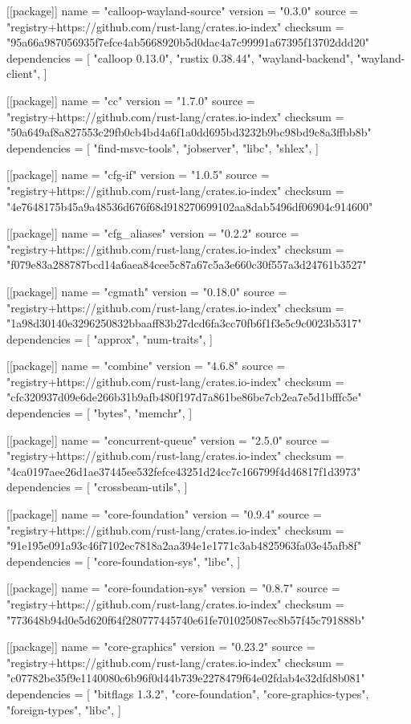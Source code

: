 [[package]]
name = "calloop-wayland-source"
version = "0.3.0"
source = "registry+https://github.com/rust-lang/crates.io-index"
checksum = "95a66a987056935f7efce4ab5668920b5d0dac4a7c99991a67395f13702ddd20"
dependencies = [
 "calloop 0.13.0",
 "rustix 0.38.44",
 "wayland-backend",
 "wayland-client",
]

[[package]]
name = "cc"
version = "1.7.0"
source = "registry+https://github.com/rust-lang/crates.io-index"
checksum = "50a649af8a827553c29fb0cb4bd4a6f1a0dd695bd3232b9bc98bd9c8a3ffbb8b"
dependencies = [
 "find-msvc-tools",
 "jobserver",
 "libc",
 "shlex",
]

[[package]]
name = "cfg-if"
version = "1.0.5"
source = "registry+https://github.com/rust-lang/crates.io-index"
checksum = "4e7648175b45a9a48536d676f68d918270699102aa8dab5496df06904c914600"

[[package]]
name = "cfg_aliases"
version = "0.2.2"
source = "registry+https://github.com/rust-lang/crates.io-index"
checksum = "f079e83a288787bcd14a6aea84cee5c87a67c5a3e660c30f557a3d24761b3527"

[[package]]
name = "cgmath"
version = "0.18.0"
source = "registry+https://github.com/rust-lang/crates.io-index"
checksum = "1a98d30140e3296250832bbaaff83b27dcd6fa3cc70fb6f1f3e5c9c0023b5317"
dependencies = [
 "approx",
 "num-traits",
]

[[package]]
name = "combine"
version = "4.6.8"
source = "registry+https://github.com/rust-lang/crates.io-index"
checksum = "cfc320937d09e6de266b31b9afb480f197d7a861be86be7cb2ea7e5d1bfffc5e"
dependencies = [
 "bytes",
 "memchr",
]

[[package]]
name = "concurrent-queue"
version = "2.5.0"
source = "registry+https://github.com/rust-lang/crates.io-index"
checksum = "4ca0197aee26d1ae37445ee532fefce43251d24cc7c166799f4d46817f1d3973"
dependencies = [
 "crossbeam-utils",
]

[[package]]
name = "core-foundation"
version = "0.9.4"
source = "registry+https://github.com/rust-lang/crates.io-index"
checksum = "91e195e091a93c46f7102ec7818a2aa394e1e1771c3ab4825963fa03e45afb8f"
dependencies = [
 "core-foundation-sys",
 "libc",
]

[[package]]
name = "core-foundation-sys"
version = "0.8.7"
source = "registry+https://github.com/rust-lang/crates.io-index"
checksum = "773648b94d0e5d620f64f280777445740e61fe701025087ec8b57f45c791888b"

[[package]]
name = "core-graphics"
version = "0.23.2"
source = "registry+https://github.com/rust-lang/crates.io-index"
checksum = "c07782be35f9e1140080c6b96f0d44b739e2278479f64e02fdab4e32dfd8b081"
dependencies = [
 "bitflags 1.3.2",
 "core-foundation",
 "core-graphics-types",
 "foreign-types",
 "libc",
]

